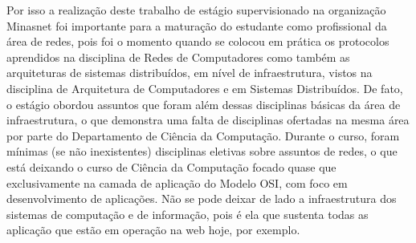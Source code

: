     Por isso a realização deste trabalho de estágio supervisionado na organização Minasnet foi importante para a maturação do estudante como profissional da área de redes, pois foi o momento quando se colocou em prática os protocolos aprendidos na disciplina de Redes de Computadores como também as arquiteturas de sistemas distribuídos, em nível de infraestrutura, vistos na disciplina de Arquitetura de Computadores e em Sistemas Distribuídos. De fato, o estágio obordou assuntos que foram além dessas disciplinas básicas da área de infraestrutura, o que demonstra uma falta de disciplinas ofertadas na mesma área por parte do Departamento de Ciência da Computação. Durante o curso, foram mínimas (se não inexistentes) disciplinas eletivas sobre assuntos de redes, o que está deixando o curso de Ciência da Computação focado quase que exclusivamente na camada de aplicação do Modelo OSI, com foco em desenvolvimento de aplicações. Não se pode deixar de lado a infraestrutura dos sistemas de computação e de informação, pois é ela que sustenta todas as aplicação que estão em operação na web hoje, por exemplo.
    